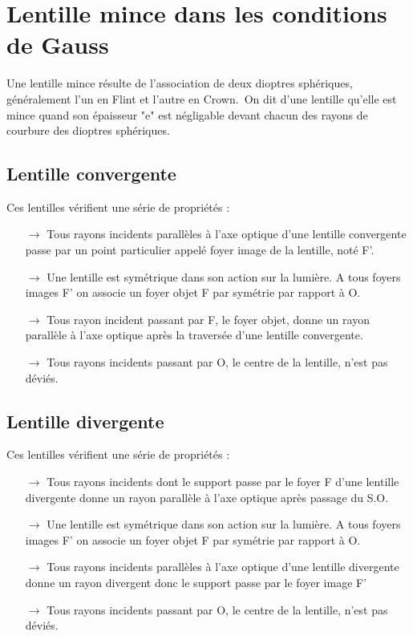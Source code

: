 \section{Lentille mince dans les conditions de Gauss}

Une lentille mince résulte de l'association de deux dioptres sphériques, généralement l'un en Flint et l'autre en Crown.\
On dit d'une lentille qu'elle est mince quand son épaisseur "e" est négligable devant chacun des rayons de courbure des dioptres sphériques.\

\subsection{Lentille convergente}

Ces lentilles vérifient une série de propriétés : 
\begin{itemize}
 \item[$\rightarrow$] Tous rayons incidents parallèles à l'axe optique d'une lentille convergente passe par un point particulier appelé foyer image de la lentille, noté F'.
 \item[$\rightarrow$] Une lentille est symétrique dans son action sur la lumière. A tous foyers images F' on associe un foyer objet F par symétrie par rapport à O.
 \item[$\rightarrow$] Tous rayon incident passant par F, le foyer objet, donne un rayon parallèle à l'axe optique après la traversée d'une lentille convergente.
 \item[$\rightarrow$] Tous rayons incidents passant par O, le centre de la lentille, n'est pas déviés.
\end{itemize}

\subsection{Lentille divergente}

Ces lentilles vérifient une série de propriétés : 
\begin{itemize}
  \item[$\rightarrow$] Tous rayons incidents dont le support passe par le foyer F d'une lentille divergente donne un rayon parallèle à l'axe optique après passage du S.O.
 \item[$\rightarrow$] Une lentille est symétrique dans son action sur la lumière. A tous foyers images F' on associe un foyer objet F par symétrie par rapport à O.
  \item[$\rightarrow$] Tous rayons incidents parallèles à l'axe optique d'une lentille divergente donne un rayon divergent donc le support passe par le foyer image F'
 \item[$\rightarrow$] Tous rayons incidents passant par O, le centre de la lentille, n'est pas déviés.
\end{itemize}

